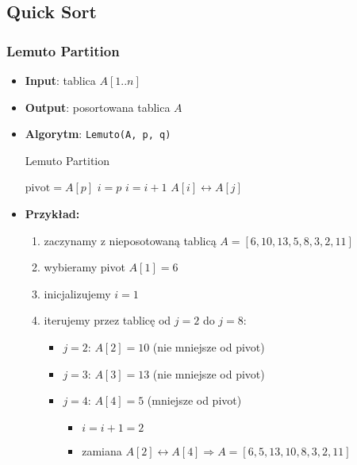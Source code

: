 \documentclass[11pt,a4paper]{article}
\begin{document}
\subsection{Quick Sort}
\subsubsection{Lemuto Partition}
\begin{itemize}
    \item \textbf{Input}: tablica $A[1..n]$
    \item \textbf{Output}: posortowana tablica $A$
    \item \textbf{Algorytm}: \texttt{Lemuto(A, p, q)}
        \begin{algorithm}
            \caption{Lemuto Partition}
            \begin{algorithmic}[1]
                \State $\text{pivot} = A[p]$
                \State $i = p$
                \State $i = i + 1$
                \State {} $A[i] \leftrightarrow A[j]$
                \EndIf
                \EndFor
                \EndProcedure
            \end{algorithmic}
        \end{algorithm}
    \item \textbf{Przykład:}
        \begin{enumerate}
            \item zaczynamy z nieposotowaną tablicą $A = [6,10,13,5,8,3,2,11]$
                \item wybieramy pivot $A[1] = 6$
            \item inicjalizujemy $i = 1$
            \item iterujemy przez tablicę od $j = 2$ do $j = 8$:
                \begin{itemize}
                    \item $j = 2$: $A[2] = 10$ (nie mniejsze od pivot)
                    \item $j = 3$: $A[3] = 13$ (nie mniejsze od pivot)
                    \item $j = 4$: $A[4] = 5$ (mniejsze od pivot)
                        \begin{itemize}
                            \item $i = i + 1 = 2$
                            \item zamiana $A[2] \leftrightarrow A[4] \Rightarrow A = [6, 5, 13, 10, 8, 3, 2, 11]$

\end{itemize}
\end{itemize}
\end{enumerate}
\end{itemize}
\end{document}
